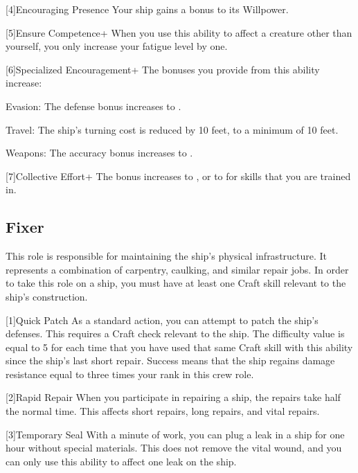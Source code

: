         [4]{Encouraging Presence} Your ship gains a  bonus to its Willpower.

        [5]{Ensure Competence+} When you use this ability to affect a creature other than yourself, you only increase your fatigue level by one.

        [6]{Specialized Encouragement+} The bonuses you provide from this ability increase:
        \begin{raggeditemize}
            \item Evasion: The defense bonus increases to .
            \item Travel: The ship's turning cost is reduced by 10 feet, to a minimum of 10 feet.
            \item Weapons: The accuracy bonus increases to .
        \end{raggeditemize}

        [7]{Collective Effort+} The bonus increases to , or to  for skills that you are trained in.

    \subsection{Fixer}
        This role is responsible for maintaining the ship's physical infrastructure.
        It represents a combination of carpentry, caulking, and similar repair jobs.
        In order to take this role on a ship, you must have at least one Craft skill relevant to the ship's construction.

        [1]{Quick Patch} As a standard action, you can attempt to patch the ship's defenses.
        This requires a Craft check relevant to the ship.
        The difficulty value is equal to 5  for each time that you have used that same Craft skill with this ability since the ship's last short repair.
        Success means that the ship regains damage resistance equal to three times your rank in this crew role.

        [2]{Rapid Repair} When you participate in repairing a ship, the repairs take half the normal time.
        This affects short repairs, long repairs, and vital repairs.

        [3]{Temporary Seal} With a minute of work, you can plug a leak in a ship for one hour without special materials.
        This does not remove the vital wound, and you can only use this ability to affect one leak on the ship.

